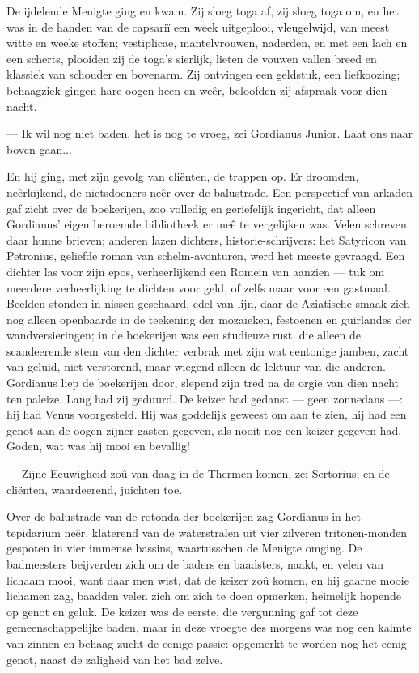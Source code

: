 \documentclass[a4paper, 12pt, oneside, dutch]{article}
\begin{document}
De ijdelende Menigte ging en kwam. Zij sloeg toga af, zij sloeg toga om, en het was in de handen van de capsariï een week uitgeplooi, vleugelwijd, van meest witte en weeke stoffen; vestiplicae, mantelvrouwen, naderden, en met een lach en een scherts, plooiden zij de toga's sierlijk, lieten de vouwen vallen breed en klassiek van schouder en bovenarm. Zij ontvingen een geldstuk, een liefkoozing; behaagziek gingen hare oogen heen en weêr, beloofden zij afspraak voor dien nacht.

--- Ik wil nog niet baden, het is nog te vroeg, zei Gordianus Junior. Laat ons naar boven gaan...

En hij ging, met zijn gevolg van cliënten, de trappen op. Er droomden, neêrkijkend, de nietsdoeners neêr over de balustrade. Een perspectief van arkaden gaf zicht over de boekerijen, zoo volledig en geriefelijk ingericht, dat alleen Gordianus' eigen beroemde bibliotheek er meê te vergelijken was. Velen schreven daar hunne brieven; anderen lazen dichters, historie-schrijvers: het Satyricon van Petronius, geliefde roman van schelm-avonturen, werd het meeste gevraagd. Een dichter las voor zijn epos, verheerlijkend een Romein van aanzien --- tuk om meerdere verheerlijking te dichten voor geld, of zelfs maar voor een gastmaal. Beelden stonden in nissen geschaard, edel van lijn, daar de Aziatische smaak zich nog alleen openbaarde in de teekening der mozaïeken, festoenen en guirlandes der wandversieringen; in de boekerijen was een studieuze rust, die alleen de scandeerende stem van den dichter verbrak met zijn wat eentonige jamben, zacht van geluid, niet verstorend, maar wiegend alleen de lektuur van die anderen. Gordianus liep de boekerijen door, slepend zijn tred na de orgie van dien nacht ten paleize. Lang had zij geduurd. De keizer had gedanst --- geen zonnedans ---: hij had Venus voorgesteld. Hij was goddelijk geweest om aan te zien, hij had een genot aan de oogen zijner gasten gegeven, als nooit nog een keizer gegeven had. Goden, wat was hij mooi en bevallig!

--- Zijne Eeuwigheid zoû van daag in de Thermen komen, zei Sertorius; en de cliënten, waardeerend, juichten toe.

Over de balustrade van de rotonda der boekerijen zag Gordianus in het tepidarium neêr, klaterend van de waterstralen uit vier zilveren tritonen-monden gespoten in vier immense bassins, waartusschen de Menigte omging. De badmeesters beijverden zich om de baders en baadsters, naakt, en velen van lichaam mooi, want daar men wist, dat de keizer zoû komen, en hij gaarne mooie lichamen zag, baadden velen zich om zich te doen opmerken, heimelijk hopende op genot en geluk. De keizer was de eerste, die vergunning gaf tot deze gemeenschappelijke baden, maar in deze vroegte des morgens was nog een kalmte van zinnen en behaag-zucht de eenige passie: opgemerkt te worden nog het eenig genot, naast de zaligheid van het bad zelve.
\end{document}
